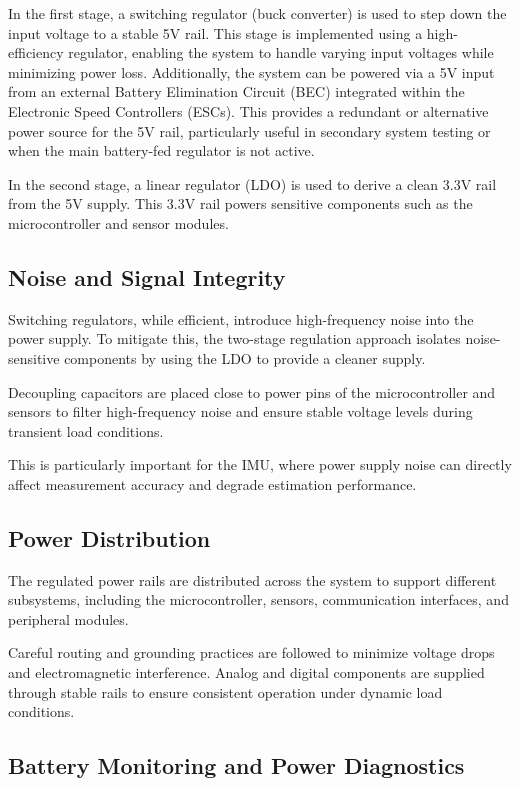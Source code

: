 In the first stage, a switching regulator (buck converter) is used to step down the input voltage to a stable 5V rail. This stage is implemented using a high-efficiency regulator, enabling the system to handle varying input voltages while minimizing power loss. Additionally, the system can be powered via a 5V input from an external Battery Elimination Circuit (BEC) integrated within the Electronic Speed Controllers (ESCs). This provides a redundant or alternative power source for the 5V rail, particularly useful in secondary system testing or when the main battery-fed regulator is not active.

In the second stage, a linear regulator (LDO) is used to derive a clean 3.3V rail from the 5V supply. This 3.3V rail powers sensitive components such as the microcontroller and sensor modules.

\subsection{Noise and Signal Integrity}

Switching regulators, while efficient, introduce high-frequency noise into the power supply. To mitigate this, the two-stage regulation approach isolates noise-sensitive components by using the LDO to provide a cleaner supply.

Decoupling capacitors are placed close to power pins of the microcontroller and sensors to filter high-frequency noise and ensure stable voltage levels during transient load conditions.

This is particularly important for the IMU, where power supply noise can directly affect measurement accuracy and degrade estimation performance.

\subsection{Power Distribution}

The regulated power rails are distributed across the system to support different subsystems, including the microcontroller, sensors, communication interfaces, and peripheral modules.

Careful routing and grounding practices are followed to minimize voltage drops and electromagnetic interference. Analog and digital components are supplied through stable rails to ensure consistent operation under dynamic load conditions.

\subsection{Battery Monitoring and Power Diagnostics}


